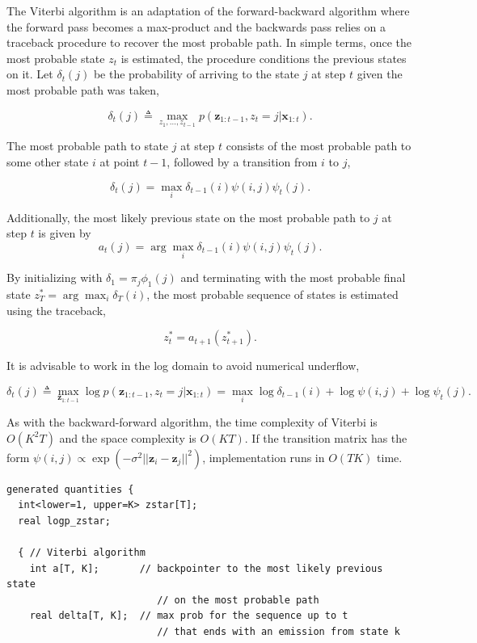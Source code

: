 \documentclass[]{article}
\newcommand{\argmax}{\arg\!\max}
\newcommand{\mat}[1]{\mathbf{#1}}
\begin{document}
{The Viterbi algorithm is an adaptation of the forward-backward algorithm
where the forward pass becomes a max-product and the backwards pass
relies on a traceback procedure to recover the most probable path. In
simple terms, once the most probable state \(z_t\) is estimated, the
procedure conditions the previous states on it. Let \(\delta_t(j)\) be
the probability of arriving to the state \(j\) at step \(t\) given the
most probable path was taken,

\[
\delta_t(j)
  \triangleq \max_{z_1, \dots, z_{t-1}} p(\mat{z}_{1:t-1}, z_t = j | \mat{x}_{1:t}).
\]

The most probable path to state \(j\) at step \(t\) consists of the most
probable path to some other state \(i\) at point \(t-1\), followed by a
transition from \(i\) to \(j\),

\[
\delta_t(j)
  = \max_{i} \delta_{t-1}(i) \psi(i, j) \psi_t(j).
\]

Additionally, the most likely previous state on the most probable path
to \(j\) at step \(t\) is given by \[
a_t(j)
  = \argmax_{i} \delta_{t-1}(i) \psi(i, j) \psi_t(j).
\]

By initializing with \(\delta_1 = \pi_j \phi_1(j)\) and terminating with
the most probable final state \(z_T^* = \argmax_{i} \delta_T(i)\), the
most probable sequence of states is estimated using the traceback,

\[
z_t^* = a_{t+1}(z_{t+1}^*).
\]

It is advisable to work in the log domain to avoid numerical underflow,

\[
\delta_t(j)
  \triangleq \max_{\mat{z}_{1:t-1}} \log p(\mat{z}_{1:t-1}, z_t = j | \mat{x}_{1:t})
  = \max_{i} \log \delta_{t-1}(i) + \log \psi(i, j) + \log \psi_t(j).
\]

As with the backward-forward algorithm, the time complexity of Viterbi
is \(O(K^2T)\) and the space complexity is \(O(KT)\). If the transition
matrix has the form
\(\psi(i, j) \propto \exp(-\sigma^2 ||\mat{z}_i - \mat{z}_j||^2)\),
implementation runs in \(O(TK)\) time.

\begin{verbatim}
generated quantities {
  int<lower=1, upper=K> zstar[T];
  real logp_zstar;

  { // Viterbi algorithm
    int a[T, K];       // backpointer to the most likely previous state 
                          // on the most probable path
    real delta[T, K];  // max prob for the sequence up to t
                          // that ends with an emission from state k


\end{verbatim}}
\end{document}
